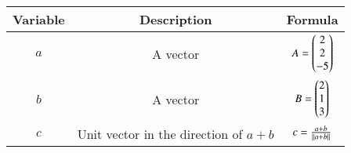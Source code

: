 \begin{center}
	\begin{tabular}{|c|c|c|} 
		\hline
		\textbf{Variable} & \textbf{Description} & \textbf{Formula} \\ 
		\hline
		$a$   & A vector & $A = \begin{pmatrix}2 \\ 2 \\ -5\end{pmatrix}$ \\ 
		\hline
		$b$   &  A vector &  $B = \begin{pmatrix}2 \\ 1\\3\end{pmatrix}$\\ 
		\hline
		$c$   & Unit vector in the direction of $a+b$ &  $c = \frac{a+b}{\left\lVert a+b\right\rVert}$\\ 
		\hline
	\end{tabular}
\end{center}  



